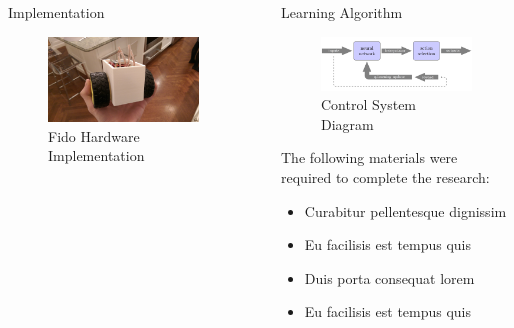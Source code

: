 \documentclass[final]{beamer}
\newlength{\sepwid}
\newlength{\onecolwid}
\newlength{\twocolwid}
\begin{document}
\begin{frame}[t]
\begin{columns}[t]
\begin{column}{\onecolwid}
\begin{block}{Implementation}
		\begin{figure}
			\centering
			\includegraphics[width=.77\linewidth]{Figures/Prototype.jpg}
			\caption{Fido Hardware Implementation}
		\end{figure}
	\end{block}


\end{column}

\begin{column}{\sepwid}\end{column} 

\begin{column}{\twocolwid}

	\begin{block}{Learning Algorithm}

		\begin{figure}
			\centering
			\includegraphics[width=.77\linewidth]{Figures/diagramRendered.png}
			\caption{Control System Diagram}
		\end{figure}

		The following materials were required to complete the research:

		\begin{itemize}
		\item Curabitur pellentesque dignissim
		\item Eu facilisis est tempus quis
		\item Duis porta consequat lorem
		\item Eu facilisis est tempus quis
		\end{itemize}


\end{block}
\end{column}
\end{columns}
\end{frame}
\end{document}
